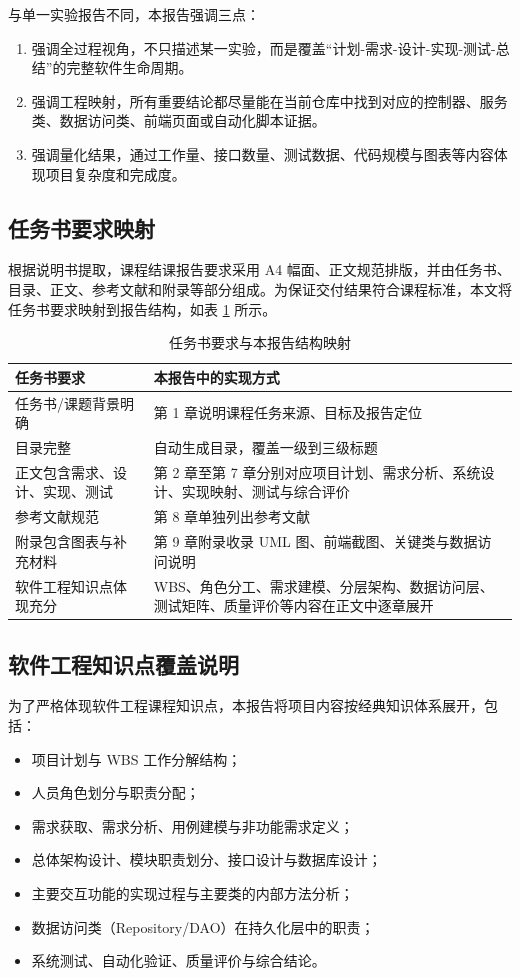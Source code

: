 \documentclass[12pt,a4paper,UTF8]{ctexart}
\begin{document}
与单一实验报告不同，本报告强调三点：
\begin{enumerate}
    \item 强调全过程视角，不只描述某一实验，而是覆盖“计划-需求-设计-实现-测试-总结”的完整软件生命周期。
    \item 强调工程映射，所有重要结论都尽量能在当前仓库中找到对应的控制器、服务类、数据访问类、前端页面或自动化脚本证据。
    \item 强调量化结果，通过工作量、接口数量、测试数据、代码规模与图表等内容体现项目复杂度和完成度。
\end{enumerate}

\subsection{任务书要求映射}
根据说明书提取，课程结课报告要求采用 A4 幅面、正文规范排版，并由任务书、目录、正文、参考文献和附录等部分组成。为保证交付结果符合课程标准，本文将任务书要求映射到报告结构，如表 \ref{tab:task-mapping} 所示。

\begin{table}[H]
    \centering
    \caption{任务书要求与本报告结构映射}
    \label{tab:task-mapping}
    \begin{tabular}{p{3.2cm}p{8.8cm}}
        \toprule
        任务书要求 & 本报告中的实现方式 \\
        \midrule
        任务书/课题背景明确 & 第 1 章说明课程任务来源、目标及报告定位 \\
        目录完整 & 自动生成目录，覆盖一级到三级标题 \\
        正文包含需求、设计、实现、测试 & 第 2 章至第 7 章分别对应项目计划、需求分析、系统设计、实现映射、测试与综合评价 \\
        参考文献规范 & 第 8 章单独列出参考文献 \\
        附录包含图表与补充材料 & 第 9 章附录收录 UML 图、前端截图、关键类与数据访问说明 \\
        软件工程知识点体现充分 & WBS、角色分工、需求建模、分层架构、数据访问层、测试矩阵、质量评价等内容在正文中逐章展开 \\
        \bottomrule
    \end{tabular}
\end{table}

\subsection{软件工程知识点覆盖说明}
为了严格体现软件工程课程知识点，本报告将项目内容按经典知识体系展开，包括：
\begin{itemize}
    \item 项目计划与 WBS 工作分解结构；
    \item 人员角色划分与职责分配；
    \item 需求获取、需求分析、用例建模与非功能需求定义；
    \item 总体架构设计、模块职责划分、接口设计与数据库设计；
    \item 主要交互功能的实现过程与主要类的内部方法分析；
    \item 数据访问类（Repository/DAO）在持久化层中的职责；
    \item 系统测试、自动化验证、质量评价与综合结论。
\end{itemize}
\end{document}

